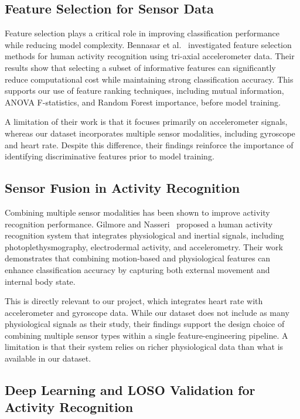 \documentclass[12pt,a4paper]{cibb}
\begin{document}
\subsection{Feature Selection for Sensor Data}

Feature selection plays a critical role in improving classification performance while reducing model complexity. Bennasar et al.~\cite{bennasar2022significant} investigated feature selection methods for human activity recognition using tri-axial accelerometer data. Their results show that selecting a subset of informative features can significantly reduce computational cost while maintaining strong classification accuracy. This supports our use of feature ranking techniques, including mutual information, ANOVA F-statistics, and Random Forest importance, before model training.

A limitation of their work is that it focuses primarily on accelerometer signals, whereas our dataset incorporates multiple sensor modalities, including gyroscope and heart rate. Despite this difference, their findings reinforce the importance of identifying discriminative features prior to model training.

\subsection{Sensor Fusion in Activity Recognition}

Combining multiple sensor modalities has been shown to improve activity recognition performance. Gilmore and Nasseri~\cite{gilmore2024fusion} proposed a human activity recognition system that integrates physiological and inertial signals, including photoplethysmography, electrodermal activity, and accelerometry. Their work demonstrates that combining motion-based and physiological features can enhance classification accuracy by capturing both external movement and internal body state.

This is directly relevant to our project, which integrates heart rate with accelerometer and gyroscope data. While our dataset does not include as many physiological signals as their study, their findings support the design choice of combining multiple sensor types within a single feature-engineering pipeline. A limitation is that their system relies on richer physiological data than what is available in our dataset.


\subsection{Deep Learning and LOSO Validation for Activity Recognition}
\end{document}
